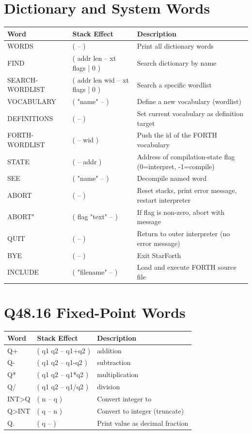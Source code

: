 \section*{Dictionary and System Words}
\begin{longtable}{>{\ttfamily}lp{4.5cm}p{7cm}}
\toprule
\normalfont Word & Stack Effect & Description \\
\midrule
\endhead
\bottomrule
\endfoot
WORDS   & ( -- )              & Print all dictionary words \\
FIND    & ( addr len -- xt flags | 0 ) & Search dictionary by name \\
SEARCH-WORDLIST & ( addr len wid -- xt flags | 0 ) & Search a specific wordlist \\
VOCABULARY & ( "name" -- )   & Define a new vocabulary (wordlist) \\
DEFINITIONS & ( -- )         & Set current vocabulary as definition target \\
FORTH-WORDLIST & ( -- wid )  & Push the id of the FORTH vocabulary \\
STATE   & ( -- addr )         & Address of compilation-state flag (0=interpret, -1=compile) \\
SEE     & ( "name" -- )       & Decompile named word \\
ABORT   & ( -- )              & Reset stacks, print error message, restart interpreter \\
ABORT"  & ( flag "text" -- )  & If flag is non-zero, abort with message \\
QUIT    & ( -- )              & Return to outer interpreter (no error message) \\
BYE     & ( -- )              & Exit StarForth \\
INCLUDE & ( "filename" -- )   & Load and execute FORTH source file \\
\end{longtable}

\section*{Q48.16 Fixed-Point Words}
\begin{longtable}{>{\ttfamily}lp{4.5cm}p{7cm}}
\toprule
\normalfont Word & Stack Effect & Description \\
\midrule
\endhead
\bottomrule
\endfoot
Q+      & ( q1 q2 -- q1+q2 )  & \Qtype{} addition \\
Q-      & ( q1 q2 -- q1-q2 )  & \Qtype{} subtraction \\
Q*      & ( q1 q2 -- q1*q2 )  & \Qtype{} multiplication \\
Q/      & ( q1 q2 -- q1/q2 )  & \Qtype{} division \\
INT>Q   & ( n -- q )           & Convert integer to \Qtype{} \\
Q>INT   & ( q -- n )           & Convert \Qtype{} to integer (truncate) \\
Q.      & ( q -- )             & Print \Qtype{} value as decimal fraction \\
\end{longtable}

